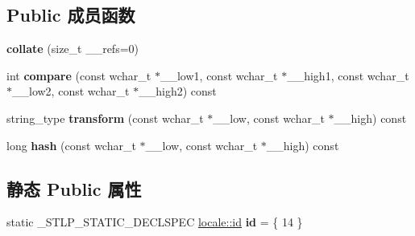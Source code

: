 \subsection*{Public 成员函数}
\begin{DoxyCompactItemize}
\item 
\mbox{\label{classcollate_3_01wchar__t_01_4_a41a8fa44876d016e507af38aedb4c171}} 
{\bfseries collate} (size\+\_\+t \+\_\+\+\_\+refs=0)
\item 
\mbox{\label{classcollate_3_01wchar__t_01_4_a667ef24afb5b3e6df2cf5cab2db9b0b7}} 
int {\bfseries compare} (const wchar\+\_\+t $\ast$\+\_\+\+\_\+low1, const wchar\+\_\+t $\ast$\+\_\+\+\_\+high1, const wchar\+\_\+t $\ast$\+\_\+\+\_\+low2, const wchar\+\_\+t $\ast$\+\_\+\+\_\+high2) const
\item 
\mbox{\label{classcollate_3_01wchar__t_01_4_ab3d7459680b7d0c452ac566ac5f7ec72}} 
string\+\_\+type {\bfseries transform} (const wchar\+\_\+t $\ast$\+\_\+\+\_\+low, const wchar\+\_\+t $\ast$\+\_\+\+\_\+high) const
\item 
\mbox{\label{classcollate_3_01wchar__t_01_4_a3cf69deeabbb5bdff76dca56a23eb553}} 
long {\bfseries hash} (const wchar\+\_\+t $\ast$\+\_\+\+\_\+low, const wchar\+\_\+t $\ast$\+\_\+\+\_\+high) const
\end{DoxyCompactItemize}
\subsection*{静态 Public 属性}
\begin{DoxyCompactItemize}
\item 
\mbox{\label{classcollate_3_01wchar__t_01_4_a7d95c2d0f5d9caf83fee084eef94ba0b}} 
static \+\_\+\+S\+T\+L\+P\+\_\+\+S\+T\+A\+T\+I\+C\+\_\+\+D\+E\+C\+L\+S\+P\+EC \hyperlink{classlocale_1_1id}{locale\+::id} {\bfseries id} = \{ 14 \}
\end{DoxyCompactItemize}

